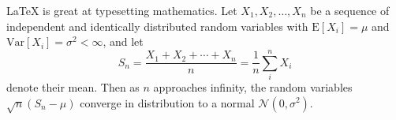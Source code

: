 \documentclass{report}
\begin{document}
\LaTeX{} is great at typesetting mathematics. Let $X_1, X_2, \ldots, X_n$ be a sequence of independent and identically distributed random variables with $\text{E}[X_i] = \mu$ and $\text{Var}[X_i] = \sigma^2 < \infty$, and let
\[S_n = \frac{X_1 + X_2 + \cdots + X_n}{n}
      = \frac{1}{n}\sum_{i}^{n} X_i\]
denote their mean. Then as $n$ approaches infinity, the random variables $\sqrt{n}(S_n - \mu)$ converge in distribution to a normal $\mathcal{N}(0, \sigma^2)$.
\end{document}

